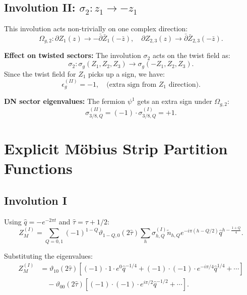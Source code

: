 \documentclass[11pt]{article}
\newcommand{\vt}{\vartheta}
\newcommand{\hq}{\hat{q}}
\newcommand{\htau}{\hat{\tau}}
\begin{document}
\subsection{Involution II: $\sigma_2: z_1 \to -z_1$}

This involution acts non-trivially on one complex direction:
\begin{equation}
\Omega_{g,2}: \partial Z_1(z) \to -\bar{\partial} \bar{Z}_1(-\bar{z}), \quad \partial Z_{2,3}(z) \to \bar{\partial} \bar{Z}_{2,3}(-\bar{z}).
\end{equation}

\textbf{Effect on twisted sectors:}
The involution $\sigma_2$ acts on the twist field as:
\begin{equation}
\sigma_2: \sigma_g(Z_1, Z_2, Z_3) \to \sigma_g(-Z_1, Z_2, Z_3).
\end{equation}
Since the twist field for $Z_1$ picks up a sign, we have:
\begin{equation}
\epsilon_g^{(II)} = -1, \quad \text{(extra sign from $Z_1$ direction)}.
\end{equation}

\textbf{DN sector eigenvalues:}
The fermion $\psi^1$ gets an extra sign under $\Omega_{g,2}$:
\begin{equation}
\sigma^{(II)}_{3/8, Q} = (-1) \cdot \sigma^{(I)}_{3/8, Q} = +1.
\end{equation}

\section{Explicit M\"obius Strip Partition Functions}\label{app:mobius}

\subsection{Involution I}

Using $\hq = -e^{-2\pi t}$ and $\htau = \tau + 1/2$:
\begin{equation}
Z_M^{(I)} = \sum_{Q=0,1} (-1)^{1-Q} \vt_{1-Q,0}(2\htau) \sum_h \sigma^{(I)}_{h,Q} \tilde{n}_{h,Q} e^{-i\pi(h-Q/2)} \hq^{h - \frac{1+Q}{4}}.
\end{equation}

Substituting the eigenvalues:
\begin{align}
Z_M^{(I)} &= \vt_{10}(2\htau) \left[ (-1) \cdot 1 \cdot e^{0} \hq^{-1/4} + (-1) \cdot (-1) \cdot e^{-i\pi/4} \hq^{1/4} + \cdots \right] \nonumber \\
&\quad - \vt_{00}(2\htau) \left[ (-1) \cdot (-1) \cdot e^{i\pi/2} \hq^{-1/2} + \cdots \right].
\end{align}
\end{document}
